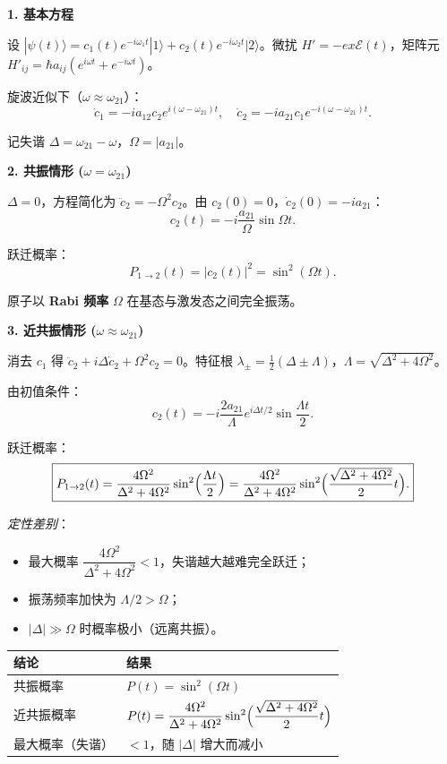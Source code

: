 \begin{derivationbox}[标准解题过程]
\textbf{1. 基本方程}

设 $|\psi(t)\rangle=c_1(t)e^{-i\omega_1t}|1\rangle+c_2(t)e^{-i\omega_2t}|2\rangle$。微扰 $H'=-ex\mathcal{E}(t)$，矩阵元 $H'_{ij}=\hbar a_{ij}(e^{i\omega t}+e^{-i\omega t})$。

旋波近似下（$\omega\approx\omega_{21}$）：
\[
\dot{c}_1=-ia_{12}c_2e^{i(\omega-\omega_{21})t},\quad\dot{c}_2=-ia_{21}c_1e^{-i(\omega-\omega_{21})t}.
\]

记失谐 $\Delta=\omega_{21}-\omega$，$\Omega=|a_{21}|$。

\textbf{2. 共振情形 ($\omega=\omega_{21}$)}

$\Delta=0$，方程简化为 $\ddot{c}_2=-\Omega^2c_2$。由 $c_2(0)=0$，$\dot{c}_2(0)=-ia_{21}$：
\[
c_2(t)=-i\frac{a_{21}}{\Omega}\sin\Omega t.
\]

跃迁概率：
\begin{equation}
\boxed{P_{1\to2}(t)=|c_2(t)|^2=\sin^2(\Omega t).}
\end{equation}

原子以 \textbf{Rabi 频率} $\Omega$ 在基态与激发态之间完全振荡。

\textbf{3. 近共振情形 ($\omega\approx\omega_{21}$)}

消去 $c_1$ 得 $\ddot{c}_2+i\Delta\dot{c}_2+\Omega^2c_2=0$。特征根 $\lambda_\pm=\frac12(\Delta\pm\Lambda)$，$\Lambda=\sqrt{\Delta^2+4\Omega^2}$。

由初值条件：
\[
c_2(t)=-i\frac{2a_{21}}{\Lambda}e^{i\Delta t/2}\sin\frac{\Lambda t}{2}.
\]

跃迁概率：
\begin{equation}
\boxed{P_{1\to2}(t)=\frac{4\Omega^2}{\Delta^2+4\Omega^2}\sin^2\Bigl(\frac{\Lambda t}{2}\Bigr)=\frac{4\Omega^2}{\Delta^2+4\Omega^2}\sin^2\Bigl(\frac{\sqrt{\Delta^2+4\Omega^2}}{2}t\Bigr).}
\end{equation}

\textit{定性差别}：
\begin{itemize}
    \item 最大概率 $\dfrac{4\Omega^2}{\Delta^2+4\Omega^2}<1$，失谐越大越难完全跃迁；
    \item 振荡频率加快为 $\Lambda/2>\Omega$；
    \item $|\Delta|\gg\Omega$ 时概率极小（远离共振）。
\end{itemize}
\end{derivationbox}

\begin{formulabox}[答案汇总]
\begin{center}
\begin{tabular}{ll}
\toprule
\textbf{结论} & \textbf{结果} \\
\midrule
共振概率 & $P(t)=\sin^2(\Omega t)$ \\
近共振概率 & $P(t)=\dfrac{4\Omega^2}{\Delta^2+4\Omega^2}\sin^2\Bigl(\dfrac{\sqrt{\Delta^2+4\Omega^2}}{2}t\Bigr)$ \\
最大概率（失谐） & $<1$，随 $|\Delta|$ 增大而减小 \\
\bottomrule
\end{tabular}
\end{center}
\end{formulabox}

